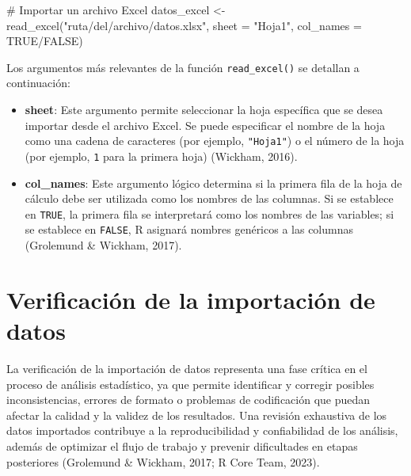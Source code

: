 \documentclass[
  spanish,
  a4paper,
  DIV=11,
  numbers=noendperiod,
  onepage,
  openany]{scrreprt}
\newenvironment{Shaded}{\begin{snugshade}}{\end{snugshade}}
\newcommand{\AttributeTok}[1]{\textcolor[rgb]{0.40,0.45,0.13}{#1}}
\newcommand{\CommentTok}[1]{\textcolor[rgb]{0.37,0.37,0.37}{#1}}
\newcommand{\ConstantTok}[1]{\textcolor[rgb]{0.56,0.35,0.01}{#1}}
\newcommand{\FunctionTok}[1]{\textcolor[rgb]{0.28,0.35,0.67}{#1}}
\newcommand{\NormalTok}[1]{\textcolor[rgb]{0.00,0.23,0.31}{#1}}
\newcommand{\OtherTok}[1]{\textcolor[rgb]{0.00,0.23,0.31}{#1}}
\newcommand{\SpecialCharTok}[1]{\textcolor[rgb]{0.37,0.37,0.37}{#1}}
\newcommand{\StringTok}[1]{\textcolor[rgb]{0.13,0.47,0.30}{#1}}
\begin{document}
\begin{Shaded}
\begin{Highlighting}[]
\CommentTok{\# Importar un archivo Excel}
\NormalTok{datos\_excel }\OtherTok{\textless{}{-}} \FunctionTok{read\_excel}\NormalTok{(}\StringTok{"ruta/del/archivo/datos.xlsx"}\NormalTok{,}
                          \AttributeTok{sheet =} \StringTok{"Hoja1"}\NormalTok{,  }
                          \AttributeTok{col\_names =} \ConstantTok{TRUE}\SpecialCharTok{/}\ConstantTok{FALSE}\NormalTok{) }
\end{Highlighting}
\end{Shaded}

Los argumentos más relevantes de la función \texttt{read\_excel()} se
detallan a continuación:

\begin{itemize}
\item
  \textbf{sheet}: Este argumento permite seleccionar la hoja específica
  que se desea importar desde el archivo Excel. Se puede especificar el
  nombre de la hoja como una cadena de caracteres (por ejemplo,
  \texttt{"Hoja1"}) o el número de la hoja (por ejemplo, \texttt{1} para
  la primera hoja) (Wickham, 2016).
\item
  \textbf{col\_names}: Este argumento lógico determina si la primera
  fila de la hoja de cálculo debe ser utilizada como los nombres de las
  columnas. Si se establece en \texttt{TRUE}, la primera fila se
  interpretará como los nombres de las variables; si se establece en
  \texttt{FALSE}, R asignará nombres genéricos a las columnas (Grolemund
  \& Wickham, 2017).
\end{itemize}

\section{Verificación de la importación de
datos}\label{verificaciuxf3n-de-la-importaciuxf3n-de-datos}

La verificación de la importación de datos representa una fase crítica
en el proceso de análisis estadístico, ya que permite identificar y
corregir posibles inconsistencias, errores de formato o problemas de
codificación que puedan afectar la calidad y la validez de los
resultados. Una revisión exhaustiva de los datos importados contribuye a
la reproducibilidad y confiabilidad de los análisis, además de optimizar
el flujo de trabajo y prevenir dificultades en etapas posteriores
(Grolemund \& Wickham, 2017; R Core Team, 2023).
\end{document}
